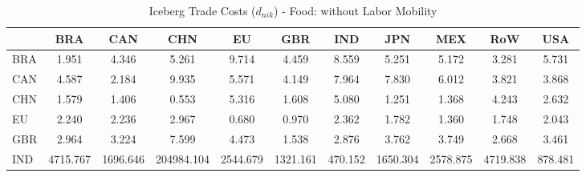 \begin{table}[htbp]
\centering
\caption{Iceberg Trade Costs ($d_{nik}$) - Food: without Labor Mobility} 
\label{tab:iceberg_Food}
\begin{tabular}{lcccccccccc}
  \hline
 & BRA & CAN & CHN & EU & GBR & IND & JPN & MEX & RoW & USA \\ 
  \hline
BRA & \textcolor[RGB]{212,137,43}{1.951} & \textcolor[RGB]{107,69,148}{4.346} & \textcolor[RGB]{66,43,189}{5.261} & \textcolor[RGB]{33,21,222}{9.714} & \textcolor[RGB]{105,68,150}{4.459} & \textcolor[RGB]{36,23,219}{8.559} & \textcolor[RGB]{69,45,186}{5.251} & \textcolor[RGB]{74,48,181}{5.172} & \textcolor[RGB]{150,97,105}{3.281} & \textcolor[RGB]{56,36,199}{5.731} \\ 
  CAN & \textcolor[RGB]{97,63,158}{4.587} & \textcolor[RGB]{201,130,54}{2.184} & \textcolor[RGB]{31,20,224}{9.935} & \textcolor[RGB]{61,40,194}{5.571} & \textcolor[RGB]{112,73,143}{4.149} & \textcolor[RGB]{38,25,217}{7.964} & \textcolor[RGB]{41,26,214}{7.830} & \textcolor[RGB]{54,35,201}{6.012} & \textcolor[RGB]{125,81,130}{3.821} & \textcolor[RGB]{120,78,135}{3.868} \\ 
  CHN & \textcolor[RGB]{227,147,28}{1.579} & \textcolor[RGB]{232,150,23}{1.406} & \textcolor[RGB]{252,163,3}{0.553} & \textcolor[RGB]{64,41,191}{5.316} & \textcolor[RGB]{222,144,33}{1.608} & \textcolor[RGB]{77,50,178}{5.080} & \textcolor[RGB]{242,157,13}{1.251} & \textcolor[RGB]{237,153,18}{1.368} & \textcolor[RGB]{110,71,145}{4.243} & \textcolor[RGB]{186,120,69}{2.632} \\ 
  EU & \textcolor[RGB]{196,127,59}{2.240} & \textcolor[RGB]{199,129,56}{2.236} & \textcolor[RGB]{161,104,94}{2.967} & \textcolor[RGB]{250,162,5}{0.680} & \textcolor[RGB]{247,160,8}{0.970} & \textcolor[RGB]{191,124,64}{2.362} & \textcolor[RGB]{214,139,41}{1.782} & \textcolor[RGB]{240,155,15}{1.360} & \textcolor[RGB]{217,140,38}{1.748} & \textcolor[RGB]{207,134,48}{2.043} \\ 
  GBR & \textcolor[RGB]{163,106,92}{2.964} & \textcolor[RGB]{153,99,102}{3.224} & \textcolor[RGB]{43,28,212}{7.599} & \textcolor[RGB]{102,66,153}{4.473} & \textcolor[RGB]{230,148,26}{1.538} & \textcolor[RGB]{176,114,79}{2.876} & \textcolor[RGB]{128,82,128}{3.762} & \textcolor[RGB]{133,86,122}{3.749} & \textcolor[RGB]{181,117,74}{2.668} & \textcolor[RGB]{145,94,110}{3.461} \\ 
  IND & \textcolor[RGB]{5,3,250}{4715.767} & \textcolor[RGB]{13,8,242}{1696.646} & \textcolor[RGB]{0,0,255}{204984.104} & \textcolor[RGB]{10,7,245}{2544.679} & \textcolor[RGB]{18,12,237}{1321.161} & \textcolor[RGB]{23,15,232}{470.152} & \textcolor[RGB]{15,10,240}{1650.304} & \textcolor[RGB]{8,5,247}{2578.875} & \textcolor[RGB]{3,2,252}{4719.838} & \textcolor[RGB]{20,13,235}{878.481} \\ 

\end{tabular}
\end{table}
